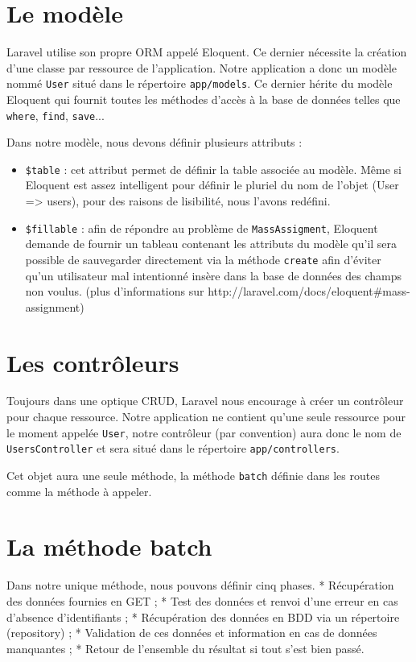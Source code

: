 \section{Le modèle}

Laravel utilise son propre ORM appelé Eloquent. Ce dernier nécessite la création d'une classe par ressource de l'application. Notre application a donc un modèle nommé \verb|User| situé dans le répertoire \verb|app/models|. Ce dernier hérite du modèle Eloquent qui fournit toutes les méthodes d'accès à la base de données telles que \verb|where|, \verb|find|, \verb|save|...

Dans notre modèle, nous devons définir plusieurs attributs :
\begin{itemize}
   \item \verb|$table| : cet attribut permet de définir la table associée au modèle. Même si Eloquent est assez intelligent pour définir le pluriel du nom de l'objet (User => users), pour des raisons de lisibilité, nous l'avons redéfini.
   \item \verb|$fillable| : afin de répondre au problème de \verb|MassAssigment|, Eloquent demande de fournir un tableau contenant les attributs du modèle qu'il sera possible de sauvegarder directement via la méthode \verb|create| afin d'éviter qu'un utilisateur mal intentionné insère dans la base de données des champs non voulus. (plus d'informations sur http://laravel.com/docs/eloquent\#mass-assignment)
\end{itemize}
\section{Les contrôleurs}

Toujours dans une optique CRUD, Laravel nous encourage à créer un contrôleur pour chaque ressource. Notre application ne contient qu'une seule ressource pour le moment appelée \verb|User|, notre contrôleur (par convention) aura donc le nom de \verb|UsersController| et sera situé dans le répertoire \verb|app/controllers|.

Cet objet aura une seule méthode, la méthode \verb|batch| définie dans les routes comme la méthode à appeler.

\section{La méthode batch}

Dans notre unique méthode, nous pouvons définir cinq phases.
  * Récupération des données fournies en GET ;
  * Test des données et renvoi d'une erreur en cas d'absence d'identifiants ;
  * Récupération des données en BDD via un répertoire (repository) ;
  * Validation de ces données et information en cas de données manquantes ;
  * Retour de l'ensemble du résultat si tout s'est bien passé.

